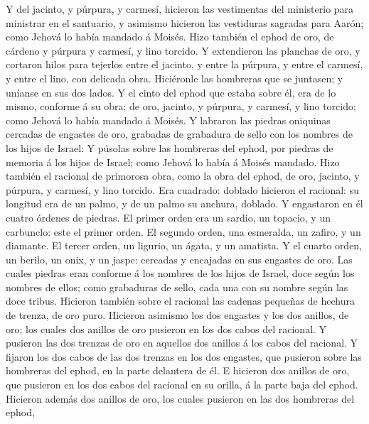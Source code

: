  Y del jacinto, y púrpura, y carmesí, hicieron las
vestimentas del ministerio para ministrar en el santuario, y asimismo
hicieron las vestiduras sagradas para Aarón; como Jehová lo había
mandado á Moisés.  Hizo también el ephod de oro, de
cárdeno y púrpura y carmesí, y lino torcido.  Y
extendieron las planchas de oro, y cortaron hilos para tejerlos entre el
jacinto, y entre la púrpura, y entre el carmesí, y entre el lino, con
delicada obra.  Hiciéronle las hombreras que se juntasen;
y uníanse en sus dos lados.  Y el cinto del ephod que
estaba sobre él, era de lo mismo, conforme á su obra; de oro, jacinto, y
púrpura, y carmesí, y lino torcido; como Jehová lo había mandado á
Moisés.  Y labraron las piedras oniquinas cercadas de
engastes de oro, grabadas de grabadura de sello con los nombres de los
hijos de Israel:  Y púsolas sobre las hombreras del ephod,
por piedras de memoria á los hijos de Israel; como Jehová lo había á
Moisés mandado.  Hizo también el racional de primorosa
obra, como la obra del ephod, de oro, jacinto, y púrpura, y carmesí, y
lino torcido.  Era cuadrado: doblado hicieron el racional:
su longitud era de un palmo, y de un palmo su anchura, doblado.
 Y engastaron en él cuatro órdenes de piedras. El primer
orden era un sardio, un topacio, y un carbunclo: este el primer orden.
 El segundo orden, una esmeralda, un zafiro, y un
diamante.  El tercer orden, un ligurio, un ágata, y un
amatista.  Y el cuarto orden, un berilo, un onix, y un
jaspe: cercadas y encajadas en sus engastes de oro.  Las
cuales piedras eran conforme á los nombres de los hijos de Israel, doce
según los nombres de ellos; como grabaduras de sello, cada una con su
nombre según las doce tribus.  Hicieron también sobre el
racional las cadenas pequeñas de hechura de trenza, de oro puro.
 Hicieron asimismo los dos engastes y los dos anillos, de
oro; los cuales dos anillos de oro pusieron en los dos cabos del
racional.  Y pusieron las dos trenzas de oro en aquellos
dos anillos á los cabos del racional.  Y fijaron los dos
cabos de las dos trenzas en los dos engastes, que pusieron sobre las
hombreras del ephod, en la parte delantera de él.  E
hicieron dos anillos de oro, que pusieron en los dos cabos del racional
en su orilla, á la parte baja del ephod.  Hicieron además
dos anillos de oro, los cuales pusieron en las dos hombreras del ephod,
